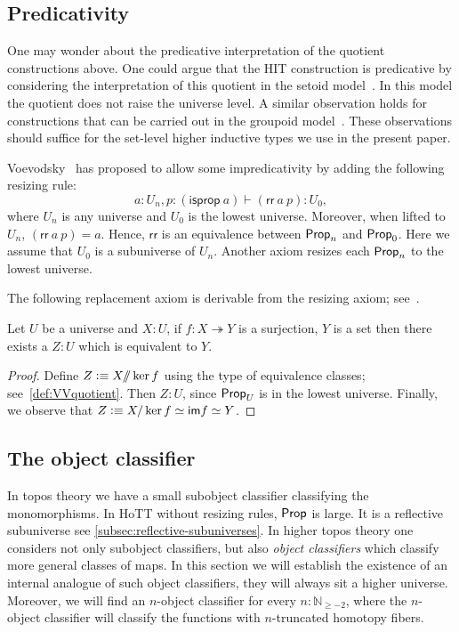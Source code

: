 \subsection{Predicativity}\label{sec:resizing}
One may wonder about the predicative interpretation of the quotient constructions above.
One could argue that the HIT construction is predicative by considering the interpretation of this
quotient in the setoid model~\cite{Altenkirch1999,coquand2012constructive}. 
In this model the quotient does not raise the universe level. 
A similar observation holds for constructions that can be carried out in the groupoid 
model~\cite{hofmann1998groupoid}. These observations should suffice for the set-level higher inductive 
types we use in the present paper.

Voevodsky~\cite{Universe-poly} has proposed to allow some impredicativity by adding the following resizing rule:
\[a:U_n, p:(\mathsf{isprop}\ a)\vdash (\mathsf{rr}\ a\ p): U_0,\]
where $U_n$ is any universe and $U_0$ is the lowest universe.
Moreover, when lifted to $U_n$, $(\mathsf{rr}\ a\ p)= a$.
Hence, $\mathsf{rr}$ is an equivalence between $\mathsf{Prop}_n$ and $\mathsf{Prop}_0$. 
Here we assume that $U_0$ is a subuniverse of $U_n$. 
Another axiom resizes each $\mathsf{Prop}_n$ to the lowest universe.

The following replacement axiom is derivable from the resizing axiom; see~\cite{Universe-poly}.
\begin{lem}\label{lem:replacement}
Let $U$ be a universe and $X:U$, if $f:X\twoheadrightarrow Y$ is a surjection, $Y$ is a set then there exists a $Z:U$ which is
equivalent to $Y$.
\end{lem}
\begin{proof}
Define $Z\vcentcolon\equiv X/\!\!/\ker f$ using the type of equivalence classes; see~\ref{def:VVquotient}. 
Then $Z:U$, since $\mathsf{Prop}_U$ is in the lowest universe. Finally, we observe that $Z\vcentcolon\equiv X/\ker f\simeq\mathsf{im} f\simeq Y$.
\end{proof}

\subsection{The object classifier}\label{subsec:object-classification}
In topos theory we have a small subobject classifier classifying the monomorphisms.
In HoTT without resizing rules, $\mathsf{Prop}$ is large. It is a reflective subuniverse see \autoref{subsec:reflective-subuniverses}.
In higher topos theory one considers not only subobject classifiers, but also \emph{object classifiers} 
which classify more general classes of maps.
In this section we will establish the existence of an internal analogue of such object classifiers, 
they will always sit a higher universe. Moreover, we will find an $n$-object classifier for
every $n:\mathbb{N}_{\geq-2}$, where the $n$-object classifier will classify the
functions with $n$-truncated homotopy fibers. 

